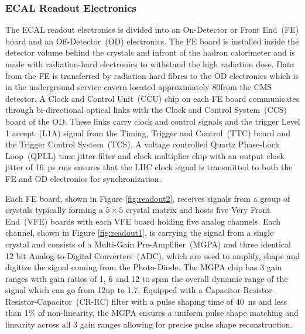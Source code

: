 \subsubsection{ECAL Readout Electronics}\label{ecalreadout}
The ECAL readout electronics is divided into an On-Detector or Front End~(FE) board and an Off-Detector~(OD) electronics. The FE board is installed inside the detector volume behind the crystals and infront of the hadron calorimeter and is made with radiation-hard electronics to withstand the high radiation dose. Data from the FE is transferred by radiation hard fibres to the OD electronics which is in the underground service cavern located approximately 80\m from the CMS detector. 
\newline
A Clock and Control Unit~(CCU) chip on each FE board communicates through bi-directional optical links with the Clock and Control System~(CCS) board of the OD. These links carry clock and control  signals and the trigger Level 1 accept~(L1A) signal from the Timing, Trigger and Control~(TTC) board and the Trigger Control System~(TCS). A voltage controlled Quartz Phase-Lock Loop~(QPLL) time jitter-filter and clock multiplier chip  with an output clock jitter of 16~ps rms ensures that the LHC clock signal is transmitted to both the FE and OD electronics for synchronization.
\par
Each FE board, shown in Figure \ref{fig:readout2}, receives signals from a group of crystals typically forming a $5\times5$ crystal matrix and hosts five Very Front End~(VFE) boards with each VFE board holding five analog channels. Each channel, shown in Figure \ref{fig:readout1}, is carrying the signal from a single crystal and consists of a Multi-Gain Pre-Amplifier~(MGPA) and three identical 12 bit Analog-to-Digital Converters~(ADC), which are used to amplify, shape and digitize the signal coming from the Photo-Diode.
\newline
The MGPA chip has 3 gain ranges with gain ratios of 1, 6 and 12 to span the overall dynamic range of the signal which can go from 12\MeV up to 1.7\TeV. Equipped with a Capacitor-Resistor-Resistor-Capacitor~(CR-RC) filter with a pulse shaping time of 40~ns and less than 1\% of non-linearity, the MGPA ensures a uniform pulse shape matching and linearity across all 3 gain ranges allowing for precise pulse shape reconstruction.
